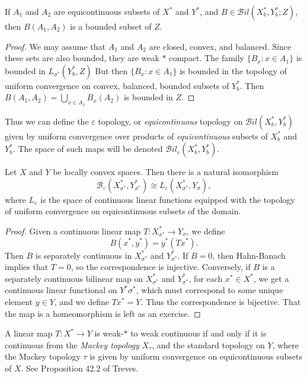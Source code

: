 \begin{lemma}
    If $A_1$ and $A_2$ are equicontinuous subsets of $X^*$ and $Y^*$, and $B \in \mathcal{B}il(X^*_b, Y^*_b; Z)$, then $B(A_1,A_2)$ is a bounded subset of $Z$.
\end{lemma}
\begin{proof}
    We may assume that $A_1$ and $A_2$ are closed, convex, and balanced. Since these sets are also bounded, they are weak $*$ compact. The family $\{ B_x: x \in A_1 \}$ is bounded in $L_{\sigma^*}(Y^*_b,Z)$ But then $\{ B_x : x \in A_1 \}$ is bounded in the topology of uniform convergence on convex, balanced, bounded subsets of $Y^*_b$. Then $B(A_1,A_2) = \bigcup_{x \in A_1} B_x(A_2)$ is bounded in $Z$.
\end{proof}

Thus we can define the $\varepsilon$ topology, or \emph{equicontinuous} topology on $\mathcal{B}il(X^*_b, Y^*_b)$ given by uniform convergence over products of \emph{equicontinuous} subsets of $X^*_b$ and $Y^*_b$. The space of such maps will be denoted $\mathcal{B}il_\varepsilon(X^*_b, Y^*_b)$.

\begin{lemma}
    Let $X$ and $Y$ be locally convex spaces. Then there is a natural isomorphism
    \[ \mathcal{B}_\varepsilon(X^*_{\sigma^*}, Y^*_{\sigma^*}) \cong L_\varepsilon(X^*_{\sigma^*}, Y_\sigma), \]
    where $L_\varepsilon$ is the space of continuous linear functions equipped with the topology of uniform convergence on equicontinuous subsets of the domain.
\end{lemma}
\begin{proof}
    Given a continuous linear map $T: X^*_{\sigma^*} \to Y_\sigma$, we define
    \[ B(x^*,y^*) = y^*(Tx^*). \]
    Then $B$ is separately continuous in $X^*_{\sigma^*}$ and $Y^*_{\sigma^*}$. If $B = 0$, then Hahn-Banach implies that $T = 0$, so the correspondence is injective. Conversely, if $B$ is a separately continuous bilinear map on $X^*_{\sigma^*}$ and $Y^*_{\sigma^*}$, for each $x^* \in X^*$, we get a continuous linear functional on $Y^*{\sigma^*}$, which must correspond to some unique element $y \in Y$, and we define $Tx^* = Y$. Thus the correspondence is bijective. That the map is a homeomorphism is left as an exercise.
\end{proof}

\begin{remark}
    A linear map $T: X^* \to Y$ is weak-$*$ to weak continuous if and only if it is continuous from the \emph{Mackey topology} $X_\tau$, and the standard topology on $Y$, where the Mackey topology $\tau$ is given by uniform convergence on equicontinuous subsets of $X$. See Proposition 42.2 of Treves.
\end{remark}

